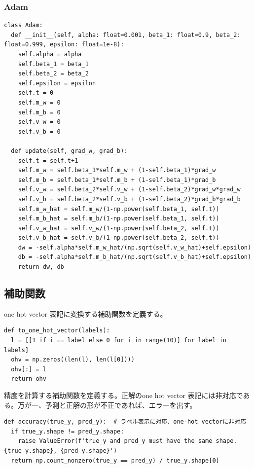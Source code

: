 \documentclass[platex,dvipdfmx]{jsarticle}
\begin{document}
\subsubsection{Adam}

\begin{lstlisting}[caption=ex\_advanced.py, label=Adam]
class Adam:
  def __init__(self, alpha: float=0.001, beta_1: float=0.9, beta_2: float=0.999, epsilon: float=1e-8):
    self.alpha = alpha
    self.beta_1 = beta_1
    self.beta_2 = beta_2
    self.epsilon = epsilon
    self.t = 0
    self.m_w = 0
    self.m_b = 0
    self.v_w = 0
    self.v_b = 0

  def update(self, grad_w, grad_b):
    self.t = self.t+1
    self.m_w = self.beta_1*self.m_w + (1-self.beta_1)*grad_w
    self.m_b = self.beta_1*self.m_b + (1-self.beta_1)*grad_b
    self.v_w = self.beta_2*self.v_w + (1-self.beta_2)*grad_w*grad_w
    self.v_b = self.beta_2*self.v_b + (1-self.beta_2)*grad_b*grad_b
    self.m_w_hat = self.m_w/(1-np.power(self.beta_1, self.t))
    self.m_b_hat = self.m_b/(1-np.power(self.beta_1, self.t))
    self.v_w_hat = self.v_w/(1-np.power(self.beta_2, self.t))
    self.v_b_hat = self.v_b/(1-np.power(self.beta_2, self.t))
    dw = -self.alpha*self.m_w_hat/(np.sqrt(self.v_w_hat)+self.epsilon)
    db = -self.alpha*self.m_b_hat/(np.sqrt(self.v_b_hat)+self.epsilon)
    return dw, db
\end{lstlisting}

\newpage

\subsection{補助関数}

one hot vector 表記に変換する補助関数を定義する。

\begin{lstlisting}[caption=ex\_advanced.py, label=toOneHotVector]
def to_one_hot_vector(labels):
  l = [[1 if i == label else 0 for i in range(10)] for label in labels]
  ohv = np.zeros((len(l), len(l[0])))
  ohv[:] = l
  return ohv
\end{lstlisting}

精度を計算する補助関数を定義する。正解のone hot vector 表記には非対応である。万が一、予測と正解の形が不正であれば、エラーを出す。

\begin{lstlisting}[caption=ex\_advanced.py, label=accuracy]
def accuracy(true_y, pred_y):  # ラベル表示に対応、one-hot vectorに非対応
  if true_y.shape != pred_y.shape:
    raise ValueError(f'true_y and pred_y must have the same shape. {true_y.shape}, {pred_y.shape}')
  return np.count_nonzero(true_y == pred_y) / true_y.shape[0]
\end{lstlisting}
\end{document}
